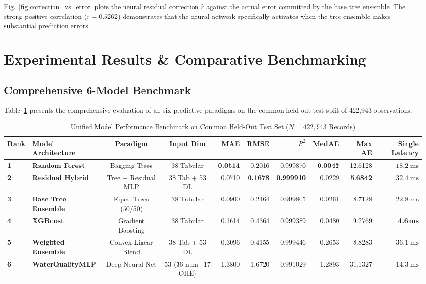 \documentclass[conference]{IEEEtran}
\begin{document}
Fig.~\ref{fig:correction_vs_error} plots the neural residual correction $\hat{r}$ against the actual error committed by the base tree ensemble. The strong positive correlation ($r = 0.5262$) demonstrates that the neural network specifically activates when the tree ensemble makes substantial prediction errors.

\section{Experimental Results \& Comparative Benchmarking}
\label{sec:results}

\subsection{Comprehensive 6-Model Benchmark}
Table~\ref{tab:master_benchmark} presents the comprehensive evaluation of all six predictive paradigms on the common held-out test split of 422,943 observations.

\begin{table}[!t]
  \caption{Unified Model Performance Benchmark on Common Held-Out Test Set ($N = 422,943$ Records)}
  \label{tab:master_benchmark}
  \centering
  \setlength{\tabcolsep}{5pt}
  \begin{tabular}{llccrrrrrr}
    \toprule
    \textbf{Rank} & \textbf{Model Architecture} & \textbf{Paradigm} & \textbf{Input Dim} & \textbf{MAE} & \textbf{RMSE} & \textbf{$R^2$} & \textbf{MedAE} & \textbf{Max AE} & \textbf{Single Latency} \\
    \midrule
    \textbf{1} & \textbf{Random Forest}      & Bagging Trees       & 38 Tabular          & \textbf{0.0514} & 0.2016          & 0.999870          & \textbf{0.0042} & 12.6128          & $18.2\text{ ms}$ \\
    \textbf{2} & \textbf{Residual Hybrid}   & Tree + Residual MLP & 38 Tab + 53 DL      & 0.0710          & \textbf{0.1678} & \textbf{0.999910} & 0.0229          & \textbf{5.6842}  & $32.4\text{ ms}$ \\
    \textbf{3} & \textbf{Base Tree Ensemble} & Equal Trees (50/50) & 38 Tabular          & 0.0900          & 0.2464          & 0.999805          & 0.0261          & 8.7128           & $22.8\text{ ms}$ \\
    \textbf{4} & \textbf{XGBoost}            & Gradient Boosting   & 38 Tabular          & 0.1614          & 0.4364          & 0.999389          & 0.0480          & 9.2769           & \textbf{4.6\,ms} \\
    \textbf{5} & \textbf{Weighted Ensemble}  & Convex Linear Blend & 38 Tab + 53 DL      & 0.3096          & 0.4155          & 0.999446          & 0.2653          & 8.8283           & $36.1\text{ ms}$ \\
    \textbf{6} & \textbf{WaterQualityMLP}    & Deep Neural Net     & 53 (36 num+17 OHE)  & 1.3800          & 1.6720          & 0.991029          & 1.2893          & 31.1327          & $14.3\text{ ms}$ \\
    \bottomrule
  \end{tabular}
\end{table}
\end{document}
